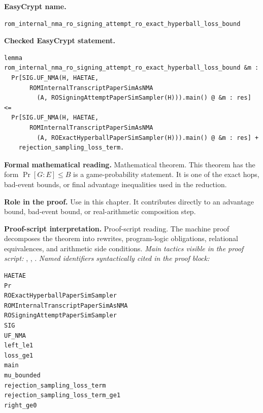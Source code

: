 \begin{formaltheorem}
\end{formaltheorem}

\begin{formaltheorem}
\noindent\textbf{EasyCrypt name.}
\begin{lstlisting}[language=EasyCrypt,basicstyle=\ttfamily\scriptsize]
rom_internal_nma_ro_signing_attempt_ro_exact_hyperball_loss_bound
\end{lstlisting}
\noindent\textbf{Checked EasyCrypt statement.}
\begin{lstlisting}[language=EasyCrypt,basicstyle=\ttfamily\scriptsize]
lemma rom_internal_nma_ro_signing_attempt_ro_exact_hyperball_loss_bound &m :
  Pr[SIG.UF_NMA(H, HAETAE,
       ROMInternalTranscriptPaperSimAsNMA
         (A, ROSigningAttemptPaperSimSampler(H))).main() @ &m : res] <=
  Pr[SIG.UF_NMA(H, HAETAE,
       ROMInternalTranscriptPaperSimAsNMA
         (A, ROExactHyperballPaperSimSampler(H))).main() @ &m : res] +
    rejection_sampling_loss_term.
\end{lstlisting}
\noindent\textbf{Formal mathematical reading.}
Mathematical theorem. This theorem has the form \(\Pr[G:E] \le B\) is a game-probability statement.  It is one of the exact hops, bad-event bounds, or final advantage inequalities used in the reduction.

\noindent\textbf{Role in the proof.}
Use in this chapter. It contributes directly to an advantage bound, bad-event bound, or real-arithmetic composition step.

\noindent\textbf{Proof-script interpretation.}
Proof-script reading. The machine proof decomposes the theorem into rewrites, program-logic obligations, relational equivalences, and arithmetic side conditions.
\emph{Main tactics visible in the proof script:} , , .
\emph{Named identifiers syntactically cited in the proof block:}
\begin{lstlisting}[language=EasyCrypt,basicstyle=\ttfamily\scriptsize]
HAETAE
Pr
ROExactHyperballPaperSimSampler
ROMInternalTranscriptPaperSimAsNMA
ROSigningAttemptPaperSimSampler
SIG
UF_NMA
left_le1
loss_ge1
main
mu_bounded
rejection_sampling_loss_term
rejection_sampling_loss_term_ge1
right_ge0
\end{lstlisting}

\end{formaltheorem}

